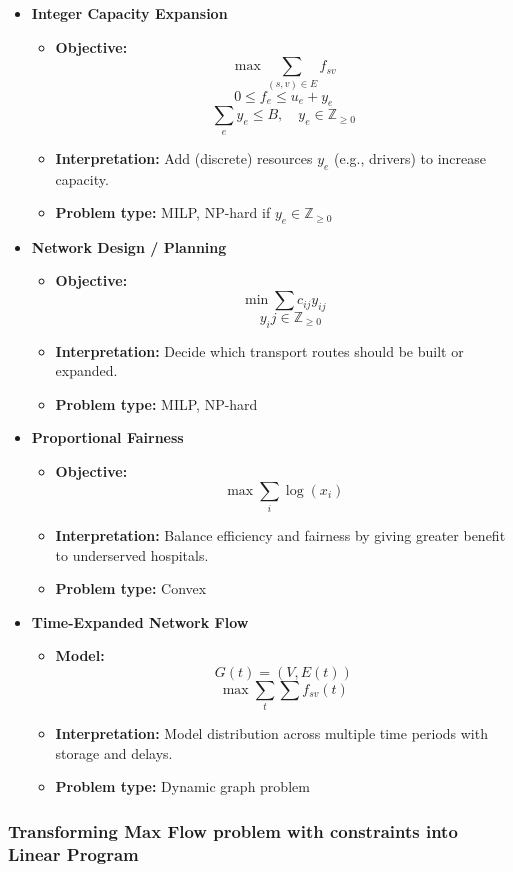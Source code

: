 \documentclass[12pt, openany]{article}
\begin{document}
\begin{itemize}
\item \textbf{Integer Capacity Expansion}
\begin{itemize}
\item \textbf{Objective:}
\[
\max \sum_{(s,v)\in E} f_{sv}
\]
\[
0 \le f_e \le u_e + y_e
\]
\[
\sum_e y_e \le B, \quad y_e \in \mathbb{Z}_{\ge 0}
\]
\item \textbf{Interpretation:} Add (discrete) resources \(y_e\) (e.g., drivers) to increase capacity. 
\item \textbf{Problem type:} MILP, NP-hard if \(y_e \in \mathbb{Z}_{\ge 0}\)
\end{itemize}

\item \textbf{Network Design / Planning}
\begin{itemize}
\item \textbf{Objective:}
\[
\min \sum c_{ij} y_{ij}
\]
\[
\quad y_ij \in \mathbb{Z}_{\ge 0}
\]
\item \textbf{Interpretation:} Decide which transport routes should be built or expanded.
\item \textbf{Problem type:} MILP, NP-hard
\end{itemize}

\item \textbf{Proportional Fairness}
\begin{itemize}
\item \textbf{Objective:}
\[
\max \sum_i \log(x_i)
\]
\item \textbf{Interpretation:} Balance efficiency and fairness by giving greater benefit to underserved hospitals.
\item \textbf{Problem type:} Convex
\end{itemize}


\item \textbf{Time-Expanded Network Flow}
\begin{itemize}
\item \textbf{Model:}
\[
G(t)=(V,E(t))
\]
\[
\max \sum_t \sum f_{sv}(t)
\]
\item \textbf{Interpretation:} Model distribution across multiple time periods with storage and delays.
\item \textbf{Problem type:} Dynamic graph problem
\end{itemize}
\end{itemize}

\subsubsection{Transforming Max Flow problem with constraints into Linear Program}
\end{document}

